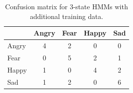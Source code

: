 \documentclass[]{report}   %
\begin{document}
\begin{table}[htbp]
	\centering
		\begin{tabular}{|l|c|c|c|c|}
		\hline
             & Angry & Fear & Happy & Sad \\ \hline
        Angry & 4     & 2    & 0     & 0   \\ \hline
        Fear  & 0     & 5    & 2     & 1   \\ \hline
        Happy & 1     & 0    & 4    & 2  \\ \hline
        Sad   & 1     & 2    & 0     & 6  \\
		\hline
		\end{tabular}
	\caption{Confusion matrix for 3-state HMMs with additional training data.}
	\label{tab:dim3statmoredata}
\end{table}
\end{document}
